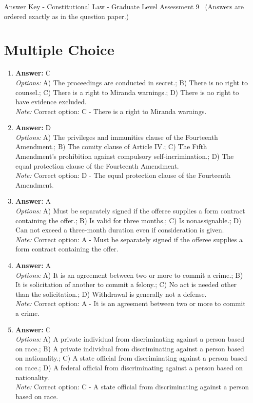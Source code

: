 \documentclass[12pt]{article}
\begin{document}
\begin{center}
Answer Key - Constitutional Law - Graduate Level Assessment 9 \
\small (Answers are ordered exactly as in the question paper.)
\end{center}

\section*{Multiple Choice}
\begin{enumerate}[label=\arabic*.]
\item \textbf{Answer:} C
\\ \textit{Options:} A) The proceedings are conducted in secret.; B) There is no right to counsel.; C) There is a right to Miranda warnings.; D) There is no right to have evidence excluded.
\\ \textit{Note:} Correct option: C - There is a right to Miranda warnings.
\item \textbf{Answer:} D
\\ \textit{Options:} A) The privileges and immunities clause of the Fourteenth Amendment.; B) The comity clause of Article IV.; C) The Fifth Amendment's prohibition against compulsory self-incrimination.; D) The equal protection clause of the Fourteenth Amendment.
\\ \textit{Note:} Correct option: D - The equal protection clause of the Fourteenth Amendment.
\item \textbf{Answer:} A
\\ \textit{Options:} A) Must be separately signed if the offeree supplies a form contract containing the offer.; B) Is valid for three months.; C) Is nonassignable.; D) Can not exceed a three-month duration even if consideration is given.
\\ \textit{Note:} Correct option: A - Must be separately signed if the offeree supplies a form contract containing the offer.
\item \textbf{Answer:} A
\\ \textit{Options:} A) It is an agreement between two or more to commit a crime.; B) It is solicitation of another to commit a felony.; C) No act is needed other than the solicitation.; D) Withdrawal is generally not a defense.
\\ \textit{Note:} Correct option: A - It is an agreement between two or more to commit a crime.
\item \textbf{Answer:} C
\\ \textit{Options:} A) A private individual from discriminating against a person based on race.; B) A private individual from discriminating against a person based on nationality.; C) A state official from discriminating against a person based on race.; D) A federal official from discriminating against a person based on nationality.
\\ \textit{Note:} Correct option: C - A state official from discriminating against a person based on race.
\end{enumerate}
\end{document}
